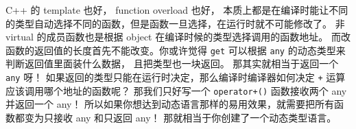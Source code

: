 C++ 的 template 也好， function overload 也好， 本质上都是在编译时能让不同的类型自动选择不同的函数，但是函数一旦选择，在运行时就不可能修改了。 非 virtual 的成员函数也是根据 object 在编译时候的类型选择调用的函数地址。 而改函数的返回值的长度首先不能改变。你或许觉得 \verb`get` 可以根据 \verb`any` 的动态类型来判断返回值里面装什么数据， 且把类型也一块返回。 那其实就相当于返回一个 \verb`any` 呀！ 如果返回的类型只能在运行时决定，那么编译时编译器如何决定 \verb`+` 运算应该调用哪个地址的函数呢？ 那我们只好写一个 \verb`operator+()` 函数接收两个 any 并返回一个 any！ 所以如果你想达到动态语言那样的易用效果，就需要把所有函数都变为只接收 any 和只返回 any！ 那就相当于你创建了一个动态类型语言。
